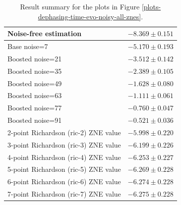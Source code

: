 \begin{table}
\caption{Result summary for the plots in Figure \ref{plots-dephasing-time-evo-noisy-all-znes}.}
\begin{tabular*}{\textwidth}{@{\extracolsep{\fill}}ll@{}}
\toprule

Noise-free estimation & $-8.369 \pm 0.151$ \\
\midrule
Base noise=7 & $-5.170 \pm 0.193$ \\
Boosted noise=21 & $-3.512 \pm 0.142$ \\
Boosted noise=35 & $-2.389 \pm 0.105$ \\
Boosted noise=49 & $-1.628 \pm 0.080$ \\
Boosted noise=63 & $-1.111 \pm 0.061$ \\
Boosted noise=77 & $-0.760 \pm 0.047$ \\
Boosted noise=91 & $-0.521 \pm 0.036$ \\
\midrule
2-point Richardson (ric-2) ZNE value & $-5.998 \pm 0.220$ \\
3-point Richardson (ric-3) ZNE value & $-6.199 \pm 0.226$ \\
4-point Richardson (ric-4) ZNE value & $-6.253 \pm 0.227$ \\
5-point Richardson (ric-5) ZNE value & $-6.269 \pm 0.228$ \\
6-point Richardson (ric-6) ZNE value & $-6.274 \pm 0.228$ \\
7-point Richardson (ric-7) ZNE value & $-6.275 \pm 0.228$ \\
\bottomrule
\end{tabular*}
\label{table-dephasing-noise-free-time-evo}
\end{table}
